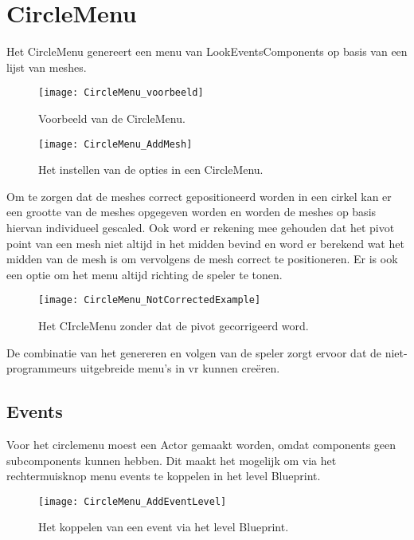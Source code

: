 \section{CircleMenu}
Het CircleMenu genereert een menu van LookEventsComponents op basis van een lijst van meshes.

\begin{figure}[!ht]
  \centering
    \texttt{[image: CircleMenu\_voorbeeld]}
    \caption{Voorbeeld van de CircleMenu.}
\end{figure}

\begin{figure}[!ht]
  \centering
    \texttt{[image: CircleMenu\_AddMesh]}
    \caption{Het instellen van de opties in een CircleMenu.}
\end{figure}

Om te zorgen dat de meshes correct gepositioneerd worden in een cirkel kan er een grootte van de meshes opgegeven worden en worden de meshes op basis hiervan individueel gescaled. Ook word er rekening mee gehouden dat het pivot point van een mesh niet altijd in het midden bevind en word er berekend wat het midden van de mesh is om vervolgens de mesh correct te positioneren. Er is ook een optie om het menu altijd richting de speler te tonen. 

\begin{figure}[!ht]
  \centering
    \texttt{[image: CircleMenu\_NotCorrectedExample]}
    \caption{Het CIrcleMenu zonder dat de pivot gecorrigeerd word.}
\end{figure}

De combinatie van het genereren en volgen van de speler zorgt ervoor dat de niet-programmeurs uitgebreide menu's in \gls{vr} kunnen creëren.

\subsection{Events}
Voor het circlemenu moest een Actor gemaakt worden, omdat components geen subcomponents kunnen hebben. Dit maakt het mogelijk om via het rechtermuisknop menu events te koppelen in het level Blueprint.

\begin{figure}[!ht]
  \centering
    \texttt{[image: CircleMenu\_AddEventLevel]}
    \caption{Het koppelen van een event via het level Blueprint.}
\end{figure}

